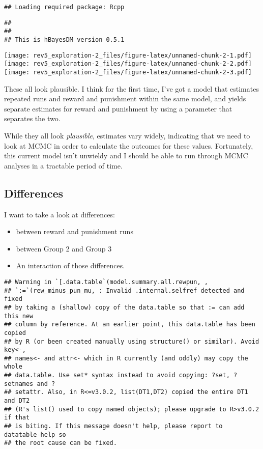 \documentclass[]{article}
\providecommand{\tightlist}{%
  \setlength{\itemsep}{0pt}\setlength{\parskip}{0pt}}
\begin{document}
\begin{verbatim}
## Loading required package: Rcpp
\end{verbatim}

\begin{verbatim}
## 
## 
## This is hBayesDM version 0.5.1
\end{verbatim}

\texttt{[image: rev5\_exploration-2\_files/figure-latex/unnamed-chunk-2-1.pdf]}
\texttt{[image: rev5\_exploration-2\_files/figure-latex/unnamed-chunk-2-2.pdf]}
\texttt{[image: rev5\_exploration-2\_files/figure-latex/unnamed-chunk-2-3.pdf]}

These all look plausible. I think for the first time, I've got a model
that estimates repeated runs and reward and punishment within the same
model, and yields separate estimates for reward and punishment by using
a parameter that separates the two.

While they all look \emph{plausible}, estimates vary widely, indicating
that we need to look at MCMC in order to calculate the outcomes for
these values. Fortunately, this current model isn't unwieldy and I
should be able to run through MCMC analyses in a tractable period of
time.

\subsection{Differences}\label{differences}

I want to take a look at differences:

\begin{itemize}
\tightlist
\item
  between reward and punishment runs
\item
  between Group 2 and Group 3
\item
  An interaction of those differences.
\end{itemize}

\begin{verbatim}
## Warning in `[.data.table`(model.summary.all.rewpun, ,
## `:=`(rew_minus_pun_mu, : Invalid .internal.selfref detected and fixed
## by taking a (shallow) copy of the data.table so that := can add this new
## column by reference. At an earlier point, this data.table has been copied
## by R (or been created manually using structure() or similar). Avoid key<-,
## names<- and attr<- which in R currently (and oddly) may copy the whole
## data.table. Use set* syntax instead to avoid copying: ?set, ?setnames and ?
## setattr. Also, in R<=v3.0.2, list(DT1,DT2) copied the entire DT1 and DT2
## (R's list() used to copy named objects); please upgrade to R>v3.0.2 if that
## is biting. If this message doesn't help, please report to datatable-help so
## the root cause can be fixed.
\end{verbatim}
\end{document}
